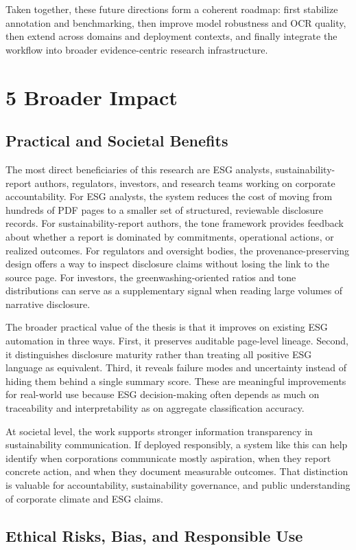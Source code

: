 Taken together, these future directions form a coherent roadmap: first stabilize annotation and benchmarking, then improve model robustness and OCR quality, then extend across domains and deployment contexts, and finally integrate the workflow into broader evidence-centric research infrastructure.
\section{5 Broader Impact}
\subsection{Practical and Societal Benefits}

The most direct beneficiaries of this research are ESG analysts, sustainability-report authors, regulators, investors, and research teams working on corporate accountability. For ESG analysts, the system reduces the cost of moving from hundreds of PDF pages to a smaller set of structured, reviewable disclosure records. For sustainability-report authors, the tone framework provides feedback about whether a report is dominated by commitments, operational actions, or realized outcomes. For regulators and oversight bodies, the provenance-preserving design offers a way to inspect disclosure claims without losing the link to the source page. For investors, the greenwashing-oriented ratios and tone distributions can serve as a supplementary signal when reading large volumes of narrative disclosure.

The broader practical value of the thesis is that it improves on existing ESG automation in three ways. First, it preserves auditable page-level lineage. Second, it distinguishes disclosure maturity rather than treating all positive ESG language as equivalent. Third, it reveals failure modes and uncertainty instead of hiding them behind a single summary score. These are meaningful improvements for real-world use because ESG decision-making often depends as much on traceability and interpretability as on aggregate classification accuracy.

At societal level, the work supports stronger information transparency in sustainability communication. If deployed responsibly, a system like this can help identify when corporations communicate mostly aspiration, when they report concrete action, and when they document measurable outcomes. That distinction is valuable for accountability, sustainability governance, and public understanding of corporate climate and ESG claims.
\subsection{Ethical Risks, Bias, and Responsible Use}

